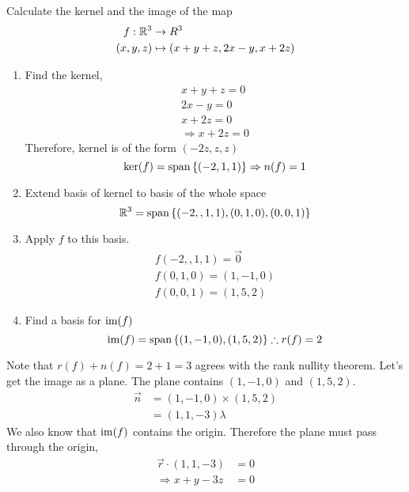 \documentclass{article}
\numberwithin{equation}{section}
\begin{document}

\begin{eg}
    Calculate the kernel and the image of the map
    \begin{align*}
        f: \mathbb{R}^3 &\rightarrow R^3 \\
        (x, y, z) &\mapsto (x + y + z, 2x - y, x + 2z)
    \end{align*}

    \begin{enumerate}[steps]
        \item Find the kernel,
        \begin{equation*}
            \begin{aligned}
                x + y + z = 0 \\
                2x - y = 0 \\
                x + 2z = 0 \\
                \hline
                \Rightarrow x + 2z = 0
            \end{aligned}
        \end{equation*}
        Therefore, kernel is of the form $(-2z, z, z)$
        \[
            \ker(f) = \operatorname{span} \left\{ (-2, 1, 1) \right\} \Rightarrow n(f) = 1  
        \]
        \item Extend basis of kernel to basis of the whole space
        \[
            \mathbb{R}^3 = \operatorname{span} \left\{ (-2, ,1, 1), (0, 1, 0), (0, 0, 1) \right\}  
        \]
        \item Apply $f$ to this basis.
        \begin{align*}
            f(-2, ,1, 1) = \vec 0 \\
            f(0, 1, 0) = (1, -1, 0) \\
            f(0, 0, 1) = (1, 5, 2)
        \end{align*}
        \item Find a basis for $\operatorname{im}(f)$
        \[
            \operatorname{im}(f) = \operatorname{span} \left\{ (1, -1, 0), (1, 5, 2) \right\} \therefore r(f) = 2
        \]
    \end{enumerate}

    Note that $r(f) + n(f) = 2 + 1 = 3$ agrees with the rank nullity theorem.
    Let's get the image as a plane.
    The plane contains $(1, -1, 0)$ and $(1, 5, 2)$. 
    \begin{align*}
        \vec n &= (1, -1, 0) \times (1, 5, 2) \\
        &= (1, 1, -3)\lambda
    \end{align*}
    We also know that $\operatorname{im}(f)$ contains the origin. Therefore the plane must pass through the origin,
    \begin{align*}
        \vec r \cdot (1, 1, -3) &= 0 \\
       \Rightarrow x + y - 3z &= 0
    \end{align*}
\end{eg}
\end{document}
